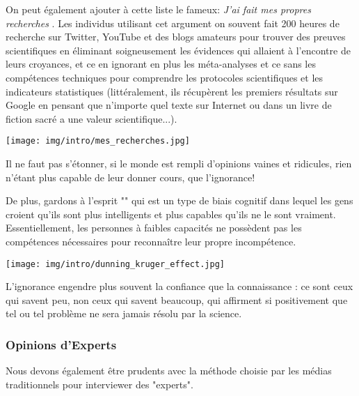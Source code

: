 	On peut également ajouter à cette liste le fameux: \og \textit{J'ai fait mes propres recherches} \fg{}. Les individus utilisant cet argument on souvent fait 200 heures de recherche sur Twitter, YouTube et des blogs amateurs pour trouver des preuves scientifiques en éliminant soigneusement les évidences qui allaient à l'encontre de leurs croyances, et ce en ignorant en plus les méta-analyses et ce sans les compétences techniques pour comprendre les protocoles scientifiques et les indicateurs statistiques (littéralement, ils récupèrent les premiers résultats sur Google en pensant que n'importe quel texte sur Internet ou dans un livre de fiction sacré a une valeur scientifique...).
	\begin{center}
		\texttt{[image: img/intro/mes\_recherches.jpg]}
	\end{center}
	Il ne faut pas s’étonner, si le monde est rempli d’opinions vaines et ridicules, rien n’étant plus capable de leur donner cours, que l’ignorance!
	
	De plus, gardons à l'esprit "\label{Dunning-Kruger effect}" qui est un type de biais cognitif dans lequel les gens croient qu'ils sont plus intelligents et plus capables qu'ils ne le sont vraiment. Essentiellement, les personnes à faibles capacités ne possèdent pas les compétences nécessaires pour reconnaître leur propre incompétence.
	\begin{center}
		\texttt{[image: img/intro/dunning\_kruger\_effect.jpg]}
	\end{center}
	\begin{fquote}L'ignorance engendre plus souvent la confiance que la connaissance : ce sont ceux qui savent peu, non ceux qui savent beaucoup, qui affirment si positivement que tel ou tel problème ne sera jamais résolu par la science.
 	\end{fquote}
	
	\pagebreak
	\pagebreak
	\subsubsection{Opinions d'Experts}
	Nous devons également être prudents avec la méthode choisie par les médias traditionnels pour interviewer des "experts".

